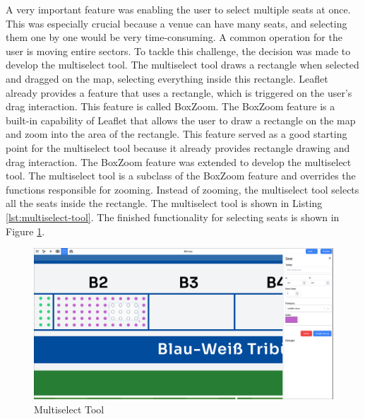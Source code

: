 A very important feature was enabling the user to select multiple seats at once. This was especially crucial because a venue can have many seats, and selecting them one by one would be very time-consuming. A common operation for the user is moving entire sectors. To tackle this challenge, the decision was made to develop the multiselect tool. The multiselect tool draws a rectangle when selected and dragged on the map, selecting everything inside this rectangle. Leaflet already provides a feature that uses a rectangle, which is triggered on the user's drag interaction. This feature is called BoxZoom. The BoxZoom feature is a built-in capability of Leaflet that allows the user to draw a rectangle on the map and zoom into the area of the rectangle. This feature served as a good starting point for the multiselect tool because it already provides rectangle drawing and drag interaction. The BoxZoom feature was extended to develop the multiselect tool. The multiselect tool is a subclass of the BoxZoom feature and overrides the functions responsible for zooming. Instead of zooming, the multiselect tool selects all the seats inside the rectangle. The multiselect tool is shown in Listing \ref{lst:multiselect-tool}. The finished functionality for selecting seats is shown in Figure \ref{fig:multiselect-tool}.
\begin{figure}
    \centering
    \includegraphics[scale=0.22]{pics/multiselect.png}
    \caption{Multiselect Tool}
    \label{fig:multiselect-tool}
\end{figure}

